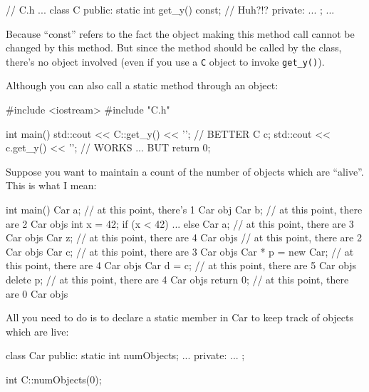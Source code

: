 \begin{consolethree}[escapeinside=||]
// C.h
...
class C
{
public:
    static int get_y() const; // Huh?!?
private:
    ...
};
...
\end{consolethree}

Because ``const'' refers to the fact the object making this method call
cannot be changed by this method. But since the method should be called
by the class, there's no object involved (even if you
use a \texttt{C} object to invoke \texttt{get\_y()}).

Although you can also call a static method through an object:

\begin{consolethree}[escapeinside=||]
#include <iostream>
#include "C.h"

int main()
{
    std::cout << C::get_y() << '\n'; // BETTER
    C c;
    std::cout << c.get_y() << '\n'; // WORKS ... BUT
    return 0;
}
\end{consolethree}




\newpage{}

Suppose you want to maintain a count of the number of objects which are
``alive''. This is what I mean:

\begin{consolethree}[escapeinside=||]
int main()
{
    Car a; // at this point, there's 1 Car obj
    Car b; // at this point, there are 2 Car objs
    int x = 42;
    if (x < 42)
    {
        ...
    }
    else
    {
        Car a; // at this point, there are 3 Car objs
        Car z; // at this point, there are 4 Car objs
    }
    // at this point, there are 2 Car objs
    Car c; // at this point, there are 3 Car objs
    Car * p = new Car;
    // at this point, there are 4 Car objs
    Car d = c; // at this point, there are 5 Car objs
    delete p; // at this point, there are 4 Car objs
    return 0; // at this point, there are 0 Car objs
}
\end{consolethree}

All you need to do is to declare a static member in Car to keep track of
objects which are live:

\begin{consolethree}[escapeinside=||]
class Car
{
public:
    static int numObjects;
    ...
private:
    ...
};

int C::numObjects(0);
\end{consolethree}

